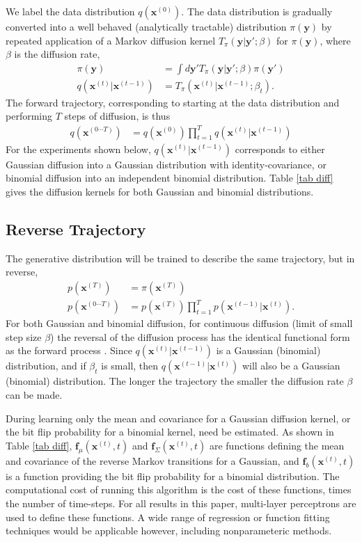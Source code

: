 \documentclass{article}
\newcommand{\mb}{\mathbf}
\newcommand{\pf}{q\left( \mb x^{(t)} | \mb x^{(t-1)} \right)}
\newcommand{\pr}{q\left( \mb x^{(t-1)} | \mb x^{(t)} \right)}
\newcommand{\qr}{p\left( \mb x^{(t-1)} | \mb x^{(t)} \right)}
\newcommand{\pst}{q \left( \mb x^{(0)} \right)}
\newcommand{\qst}{p \left( \mb x^{(T)} \right)}
\newcommand{\ptraj}{q\left( \mb x^{(0\cdots T)} \right)}
\newcommand{\qtraj}{p\left( \mb x^{(0\cdots T)} \right)}
\newcommand{\ptarget}{\pi\left( \mb x^{(T)} \right)}
\begin{document}
We label the data distribution $\pst$.  The data distribution is gradually converted into a well behaved (analytically tractable) distribution 
$\pi\left( \mb y \right)$ by repeated application of a Markov diffusion kernel $T_\pi\left( \mb y | \mb y'; \beta \right)$ for $\pi\left( \mb y \right)$, 
where $\beta$ is the diffusion rate,
\begin{align}
\pi\left( \mb y \right) &= \int d\mb y' T_\pi\left( \mb y | \mb y'; \beta \right) \pi\left( \mb y' \right) \\
\pf &= T_\pi\left( \mb x^{(t)} | \mb x^{(t-1)}; \beta_t \right)
.
\end{align}
The forward trajectory, corresponding to starting at the data distribution and performing $T$ steps of diffusion, is thus
\begin{align}
\ptraj &= \pst \prod_{t=1}^T \pf
\end{align}
For the experiments shown below, $\pf$ corresponds to either Gaussian diffusion into a Gaussian distribution with identity-covariance, or binomial 
diffusion into an independent binomial distribution.
Table \ref{tab diff} gives the diffusion kernels for both Gaussian and binomial distributions.  

\subsection{Reverse Trajectory}
\label{sec reverse}
The generative distribution will be trained to describe the same trajectory, but in reverse,
\begin{align}
\qst &= \ptarget \\
\qtraj &= \qst \prod_{t=1}^T \qr
.
\end{align}
For both Gaussian and binomial diffusion, for continuous diffusion (limit of small step size $\beta$) the reversal of the diffusion process has the 
identical functional form as the forward process \cite{feller1949theory}. 
Since $\pf$ is a Gaussian (binomial) distribution, and if $\beta_t$ is small, then $\pr$ will also be a Gaussian (binomial) 
distribution.  The longer the trajectory the smaller the diffusion rate $\beta$ can be made.

During learning only the mean and covariance for a Gaussian diffusion kernel, or the bit flip probability for a binomial kernel, need be estimated.  As 
shown in Table \ref{tab diff}, $\mb f_\mu\left( \mb x^{(t)}, t \right)$ and $\mb f_\Sigma\left( \mb x^{(t)}, t \right)$ are functions defining the mean and 
covariance of the reverse Markov transitions for a Gaussian, and $\mb f_b\left( \mb x^{(t)}, t \right)$ is a function providing the bit flip probability for 
a binomial distribution. 
The computational cost of running this algorithm is the cost of these functions, times the number of time-steps. 
For all results in this paper, multi-layer perceptrons are used to define these functions.  A wide range of regression or function fitting techniques 
would be applicable however, including nonparameteric methods.
\end{document}
